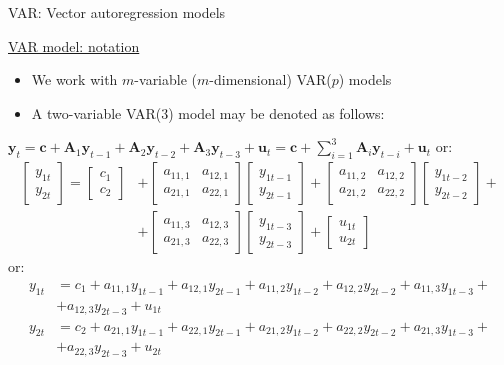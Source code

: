 \documentclass[usenames,dvipsnames]{beamer}
\begin{document}
\begin{frame}{VAR: Vector autoregression models}

{\small
\underline{VAR model: notation}
\begin{itemize}
\item We work with $m$-variable ($m$-dimensional) VAR($p$) models
\item A two-variable VAR($3$) model may be denoted as follows: \\
\end{itemize}}
$\bm{y}_t = \bm{c} + \bm{A}_1 \bm{y}_{t-1} + \bm{A}_2 \bm{y}_{t-2} + \bm{A}_3 \bm{y}_{t-3} + \bm{u}_t = \bm{c} + \sum \limits_{i=1}^3 \bm{A}_i \bm{y}_{t-i} + \bm{u}_t$
\vspace*{-1.0mm}
{\footnotesize
or:
\begin{align*}
\begin{bmatrix}
    y_{1t} \\
    y_{2t}
\end{bmatrix}
=
\begin{bmatrix}
   c_1 \\
   c_2
\end{bmatrix}
& +
\begin{bmatrix}
   a_{11,1} & \! \! \! a_{12,1}\\
   a_{21,1} & \! \! \! a_{22,1}
\end{bmatrix}
\begin{bmatrix}
   y_{1t-1} \\
   y_{2t-1}
\end{bmatrix}
+
\begin{bmatrix}
   a_{11,2} & \! \! \! a_{12,2}\\
   a_{21,2} & \! \! \! a_{22,2}
\end{bmatrix}
\begin{bmatrix}
   y_{1t-2} \\
   y_{2t-2}
\end{bmatrix}
+ \\
& +
\begin{bmatrix}
   a_{11,3} & \! \! \! a_{12,3}\\
   a_{21,3} & \! \! \! a_{22,3}
\end{bmatrix}
\begin{bmatrix}
   y_{1t-3} \\
   y_{2t-3}
\end{bmatrix}
+
\begin{bmatrix}
   u_{1t} \\
   u_{2t}
\end{bmatrix}
\end{align*}
\vspace*{-0.7mm}
or:
\begin{align*}
y_{1t} & = c_1 +  a_{11,1} y_{1t-1} + a_{12,1} y_{2t-1} + a_{11,2} y_{1t-2} + a_{12,2} y_{2t-2} + a_{11,3}  y_{1t-3} +\\
& + a_{12,3} y_{2t-3} + u_{1t}\\
y_{2t} & = c_2 +  a_{21,1} y_{1t-1} + a_{22,1} y_{2t-1} + a_{21,2} y_{1t-2} + a_{22,2} y_{2t-2} + a_{21,3}  y_{1t-3} +\\
& + a_{22,3} y_{2t-3} + u_{2t}\\
\end{align*}}
\end{frame}
\end{document}
